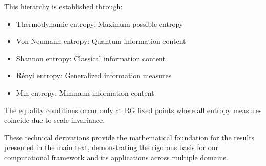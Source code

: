This hierarchy is established through:
\begin{itemize}
\item Thermodynamic entropy: Maximum possible entropy
\item Von Neumann entropy: Quantum information content
\item Shannon entropy: Classical information content
\item Rényi entropy: Generalized information measures
\item Min-entropy: Minimum information content
\end{itemize}

The equality conditions occur only at RG fixed points where all entropy measures coincide due to scale invariance.

These technical derivations provide the mathematical foundation for the results presented in the main text, demonstrating the rigorous basis for our computational framework and its applications across multiple domains.



